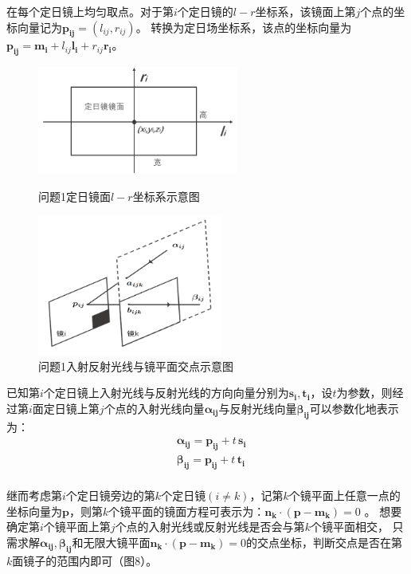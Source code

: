\documentclass{article}
\numberwithin{equation}{subsection}
\begin{document}
\vskip 0.25cm
\noindent
在每个定日镜上均匀取点。对于第$i$个定日镜的$l-r$坐标系，该镜面上第$j$个点的坐标向量记为$\bm{p_{ij}}=(l_{ij},r_{ij})$。
转换为定日场坐标系，该点的坐标向量为$\bm{p_{ij}}=\bm{m_i}+l_{ij}\bm{l_i}+r_{ij}\bm{r_i}$。
\begin{figure}[htbp]
	\begin{minipage}[b]{0.5\linewidth}
		\centering
		\includegraphics[width=2.6in]{问题1-1定日镜面建系图.png}
		\caption{问题1定日镜面$l-r$坐标系示意图}
	\end{minipage}
	\begin{minipage}[b]{0.5\linewidth}
		\centering
		\includegraphics[width=2.4in]{问题1-1定日镜反射示意图.png}
		\caption{问题1入射反射光线与镜平面交点示意图}
	\end{minipage}
\end{figure}
\vskip 0.25cm
\noindent
已知第$i$个定日镜上入射光线与反射光线的方向向量分别为$\bm{s_i},\bm{t_i}$，设$t$为参数，则经过第$i$面定日镜上第$j$个点的入射光线向量$\bm{\alpha_{ij}}$与反射光线向量$\bm{\beta_{ij}}$可以参数化地表示为：
\begin{equation}
    \begin{aligned}
        &\bm{\alpha_{ij}}=\bm{p_{ij}}+t\,\bm{s_i}\\
        &\bm{\beta_{ij}}=\bm{p_{ij}}+t\,\bm{t_i}\\
    \end{aligned}
\end{equation}

\vskip 0.25cm
\noindent
继而考虑第$i$个定日镜旁边的第$k$个定日镜$(i\neq k)$，记第$k$个镜平面上任意一点的坐标向量为$\bm{p}$，则第$k$个镜平面的镜面方程可表示为：$\bm{n_k}\cdot (\bm{p}-\bm{m_k})=0$ 。
想要确定第$i$个镜平面上第$j$个点的入射光线或反射光线是否会与第$k$个镜平面相交，
只需求解$\bm{\alpha_{ij}},\bm{\beta_{ij}}$和无限大镜平面$\bm{n_k}\cdot (\bm{p}-\bm{m_k})=0$的交点坐标，判断交点是否在第$k$面镜子的范围内即可（图8）。
\end{document}

